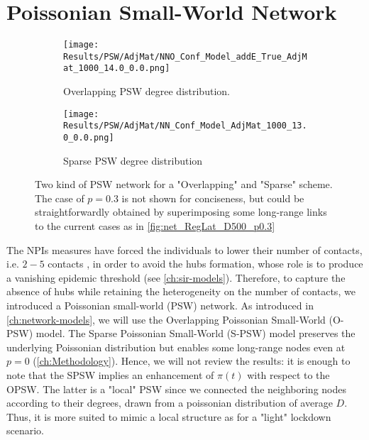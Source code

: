 \documentclass[a4paper,10pt,twoside]{book} %
\theoremstyle{definition}
\begin{document}
\section{Poissonian Small-World Network}
\thispagestyle{empty}
\label{sec:res_PSW}
\begin{figure}[ht]
    \begin{subfigure}{.45\linewidth}
        \texttt{[image: Results/PSW/AdjMat/NNO\_Conf\_Model\_addE\_True\_AdjMat\_1000\_14.0\_0.0.png]}
        \centering
        \caption{Overlapping PSW degree distribution. }
        \label{fig:net_O-PSW}
    \end{subfigure}
	\hfill
	\begin{subfigure}{.45\linewidth}
        \texttt{[image: Results/PSW/AdjMat/NN\_Conf\_Model\_AdjMat\_1000\_13.0\_0.0.png]}
        \centering
        \caption{Sparse PSW degree distribution}
        \label{fig:net_S-PSW}
    \end{subfigure}
	\caption{Two kind of PSW network for a "Overlapping" and "Sparse" scheme. The case of $p = 0.3$ is not shown for conciseness, but could be straightforwardly obtained by superimposing some long-range links to the current cases as in \autoref{fig:net_RegLat_D500_p0.3}}
\end{figure}
The NPIs measures have forced the individuals to lower their number of contacts, i.e. $2-5$ contacts \cite{Liu::2021_Review_SContactPattern}, in order to avoid the hubs formation, whose role is to produce a vanishing epidemic threshold (see \autoref{ch:sir-models}).
Therefore, to capture the absence of hubs while retaining the heterogeneity on the number of contacts, we introduced a Poissonian small-world (PSW) network.
As introduced in \autoref{ch:network-models}, we will use the Overlapping Poissonian Small-World (O-PSW) model. The Sparse Poissonian Small-World (S-PSW) model preserves the underlying Poissonian distribution but enables some long-range nodes even at $ p = 0$ (\autoref{ch:Methodology}). Hence, we will not review the results: it is enough to note that the SPSW implies an enhancement of $\pi(t)$ with respect to the OPSW. The latter is a "local" PSW since we connected the neighboring nodes according to their degrees, drawn from a poissonian distribution of average $ D$. Thus, it is more suited to mimic a local structure as for a "light" lockdown scenario.  
\end{document}
